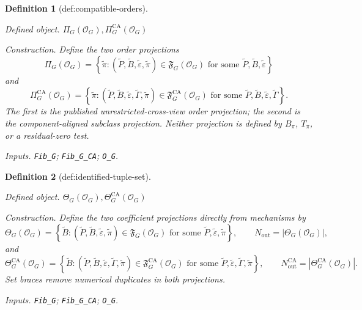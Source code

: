 \documentclass{article}
\newtheorem{definition}{Definition}
\begin{document}
\begin{definition}[def:compatible-orders]\label{def:compatible-orders}
\par\smallskip\noindent\emph{Defined object.} \(\Pi_G(\mathcal O_G),\Pi_G^{\mathrm{CA}}(\mathcal O_G)\)
\par\smallskip\noindent\emph{Construction.} Define the two order projections
\[
 \Pi_G(\mathcal O_G)=
 \left\{\widetilde\pi:
 (\widetilde P,\widetilde B,\widetilde\varepsilon,
 \widetilde\pi)\in\mathfrak F_G(\mathcal O_G)
 \text{ for some }\widetilde P,\widetilde B,
 \widetilde\varepsilon\right\}
\]
and
\[
 \Pi_G^{\mathrm{CA}}(\mathcal O_G)=
 \left\{\widetilde\pi:
 (\widetilde P,\widetilde B,\widetilde\varepsilon,
 \widetilde\Gamma,\widetilde\pi)
 \in\mathfrak F_G^{\mathrm{CA}}(\mathcal O_G)
 \text{ for some }\widetilde P,\widetilde B,
 \widetilde\varepsilon,\widetilde\Gamma\right\}.
\]
The first is the published unrestricted-cross-view order projection; the second is the component-aligned subclass projection.  Neither projection is defined by \(B_\pi\), \(T_\pi\), or a residual-zero test.
\par\smallskip\noindent\emph{Inputs.} \texttt{Fib\_\allowbreak{}G}; \texttt{Fib\_\allowbreak{}G\_\allowbreak{}CA}; \texttt{O\_\allowbreak{}G}.
\end{definition}

\begin{definition}[def:identified-tuple-set]\label{def:identified-tuple-set}
\par\smallskip\noindent\emph{Defined object.} \(\Theta_G(\mathcal O_G),\Theta_G^{\mathrm{CA}}(\mathcal O_G)\)
\par\smallskip\noindent\emph{Construction.} Define the two coefficient projections directly from mechanisms by
\[
 \Theta_G(\mathcal O_G)=
 \left\{\widetilde B:
 (\widetilde P,\widetilde B,\widetilde\varepsilon,
 \widetilde\pi)\in\mathfrak F_G(\mathcal O_G)
 \text{ for some }\widetilde P,\widetilde\varepsilon,
 \widetilde\pi\right\},
 \qquad N_{\mathrm{out}}=|\Theta_G(\mathcal O_G)|,
\]
and
\[
 \Theta_G^{\mathrm{CA}}(\mathcal O_G)=
 \left\{\widetilde B:
 (\widetilde P,\widetilde B,\widetilde\varepsilon,
 \widetilde\Gamma,\widetilde\pi)
 \in\mathfrak F_G^{\mathrm{CA}}(\mathcal O_G)
 \text{ for some }\widetilde P,\widetilde\varepsilon,
 \widetilde\Gamma,\widetilde\pi\right\},
 \qquad
 N_{\mathrm{out}}^{\mathrm{CA}}
 =|\Theta_G^{\mathrm{CA}}(\mathcal O_G)|.
\]
Set braces remove numerical duplicates in both projections.
\par\smallskip\noindent\emph{Inputs.} \texttt{Fib\_\allowbreak{}G}; \texttt{Fib\_\allowbreak{}G\_\allowbreak{}CA}; \texttt{O\_\allowbreak{}G}.
\end{definition}
\end{document}
